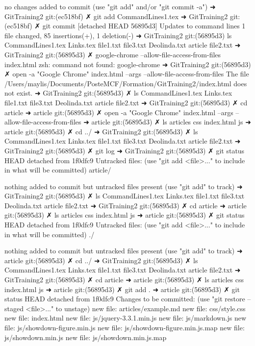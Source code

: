 no changes added to commit (use "git add" and/or "git commit -a")
➜  GitTraining2 git:(ec518bf) ✗ git add CommandLines1.tex 
➜  GitTraining2 git:(ec518bf) ✗ git commit
[detached HEAD 56895d3] Updates to command lines
 1 file changed, 85 insertions(+), 1 deletion(-)
➜  GitTraining2 git:(56895d3) ls
CommandLines1.tex Links.tex         file1.txt         file3.txt
Deolinda.txt      article           file2.txt
➜  GitTraining2 git:(56895d3) ✗ google-chrome --allow-file-access-from-files index.html
zsh: command not found: google-chrome
➜  GitTraining2 git:(56895d3) ✗ open -a "Google Chrome" index.html --args --allow-file-access-from-files
The file /Users/maylis/Documents/PosteMCF/Formation/GitTraining2/index.html does not exist.
➜  GitTraining2 git:(56895d3) ✗ ls
CommandLines1.tex Links.tex         file1.txt         file3.txt
Deolinda.txt      article           file2.txt
➜  GitTraining2 git:(56895d3) ✗ cd article 
➜  article git:(56895d3) ✗ open -a "Google Chrome" index.html --args --allow-file-access-from-files
➜  article git:(56895d3) ✗ ls
articles   css        index.html js
➜  article git:(56895d3) ✗ cd ../
➜  GitTraining2 git:(56895d3) ✗ ls
CommandLines1.tex Links.tex         file1.txt         file3.txt
Deolinda.txt      article           file2.txt
➜  GitTraining2 git:(56895d3) ✗ git log
➜  GitTraining2 git:(56895d3) ✗ git status
HEAD detached from 1f0dfc9
Untracked files:
  (use "git add <file>..." to include in what will be committed)
	article/

nothing added to commit but untracked files present (use "git add" to track)
➜  GitTraining2 git:(56895d3) ✗ ls
CommandLines1.tex Links.tex         file1.txt         file3.txt
Deolinda.txt      article           file2.txt
➜  GitTraining2 git:(56895d3) ✗ cd article 
➜  article git:(56895d3) ✗ ls
articles   css        index.html js
➜  article git:(56895d3) ✗ git status
HEAD detached from 1f0dfc9
Untracked files:
  (use "git add <file>..." to include in what will be committed)
	./

nothing added to commit but untracked files present (use "git add" to track)
➜  article git:(56895d3) ✗ cd ../
➜  GitTraining2 git:(56895d3) ✗ ls
CommandLines1.tex Links.tex         file1.txt         file3.txt
Deolinda.txt      article           file2.txt
➜  GitTraining2 git:(56895d3) ✗ cd article 
➜  article git:(56895d3) ✗ ls
articles   css        index.html js
➜  article git:(56895d3) ✗ git add . 
➜  article git:(56895d3) ✗ git status
HEAD detached from 1f0dfc9
Changes to be committed:
  (use "git restore --staged <file>..." to unstage)
	new file:   articles/example.md
	new file:   css/style.css
	new file:   index.html
	new file:   js/jquery-3.3.1.min.js
	new file:   js/markdown.js
	new file:   js/showdown-figure.min.js
	new file:   js/showdown-figure.min.js.map
	new file:   js/showdown.min.js
	new file:   js/showdown.min.js.map

